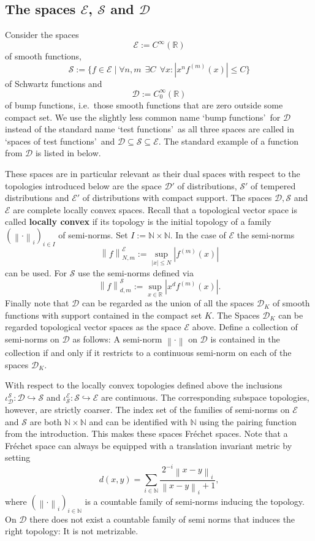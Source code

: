 \documentclass{eptcs-modified}
\newcommand{\demph}{\textbf}
\newcommand{\NN}{\mathbb{N}}
\newcommand{\EE}{\mathcal E}
\newcommand{\SF}{\mathcal S}
\newcommand{\TF}{\mathcal D}
\newcommand{\abs}[1]{\left|#1\right|}
\newcommand{\norm}[1]{\left\|#1\right\|}
\begin{document}
		\subsection{The spaces $\EE$, $\SF$ and $\TF$}
			Consider the spaces
			\[ \EE:=C^\infty(\mathbb{R}) \]
			of smooth functions,
			\[ \SF:=\big\{f\in \EE\mid \forall n,m \ \ \exists C \ \ \forall x: \abs{x^nf^{(m)}(x)}\leq C\big\} \]
			of Schwartz functions and
			\[ \TF:= C^\infty_0(\mathbb{R}) \]
			of bump functions, i.e.~those smooth functions that are zero outside some compact set.
			We use the slightly less common name \lq bump functions\rq\ for $\TF$ instead of the standard name \lq test functions\rq\ as all three spaces are called in \lq spaces of test functions\rq\ and $\TF\subseteq \SF\subseteq \EE$.
			The standard example of a function from $\TF$ is listed in  below.

			These spaces are in particular relevant as their dual spaces with respect to the topologies introduced below are the space $\TF'$ of distributions, $\SF'$ of tempered distributions and $\EE'$ of distributions with compact support.
			The spaces $\TF,\SF$ and $\EE$ are complete locally convex spaces.
			Recall that a topological vector space is called \demph{locally convex} if its topology is the initial topology of a family $(\norm{\cdot}_i)_{i\in I}$ of semi-norms.
			Set  $I:=\NN\times \NN$.
			In the case of $\EE$ the semi-norms
			\[ \norm f^\EE_{N,m} := \sup_{|x| \leq N}\abs{f^{(m)}(x)} \]
			can be used.
			For $\SF$ use the semi-norms defined via
			\[ \norm f ^\SF_{d,m} := \sup_{x \in \mathbb{R}} |x^df^{(m)}(x)|. \]
			Finally note that $\TF$ can be regarded as the union of all the spaces $\TF_K$ of smooth functions with support contained in the compact set $K$.
			The Spaces $\TF_K$ can be regarded topological vector spaces as the space $\EE$ above.
			Define a collection of semi-norms on $\TF$ as follows: A semi-norm $\norm\cdot$ on $\TF$ is contained in the collection if and only if it restricts to a continuous semi-norm on each of the spaces $\TF_K$.

			With respect to the locally convex topologies defined above the inclusions $\iota_\TF^\SF:\TF\hookrightarrow\SF$ and $\iota_\SF^\EE:\SF\hookrightarrow \EE$ are continuous.
			The corresponding subspace topologies, however, are strictly coarser.
			The index set of the families of semi-norms on $\EE$ and $\SF$ are both $\NN\times\NN$ and can be identified with $\NN$ using the pairing function from the introduction.
			This makes these spaces Fr\'echet spaces.
			Note that a Fr\'echet space can always be equipped with a translation invariant metric by setting
			\[ d(x,y) = \sum_{i \in \mathbb{N}} \frac{2^{-i} \norm{x - y}_i}{\norm{x - y}_i + 1}, \]
			where $(\norm\cdot_i)_{i\in \NN}$ is a countable family of semi-norms inducing the topology.
			On $\TF$ there does not exist a countable family of semi norms that induces the right topology:
			It is not metrizable.
\end{document}
